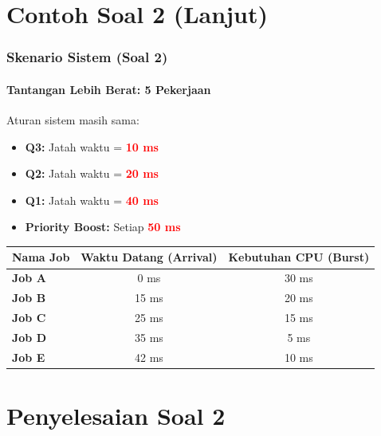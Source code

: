 \documentclass[t,aspectratio=169,xcolor=dvipsnames]{beamer}
\newcommand{\tem}[1]{\textbf{\textcolor{red}{#1}}}
\begin{document}
\section{Contoh Soal 2 (Lanjut)}

\begin{frame}
    \frametitle{Skenario Sistem (Soal 2)}
    \framesubtitle{Tantangan Lebih Berat: 5 Pekerjaan}
    \small
    Aturan sistem masih sama:
    \begin{itemize}
        \item \textbf{Q3:} Jatah waktu = \tem{10 ms}
        \item \textbf{Q2:} Jatah waktu = \tem{20 ms}
        \item \textbf{Q1:} Jatah waktu = \tem{40 ms}
        \item \textbf{Priority Boost:} Setiap \tem{50 ms}
    \end{itemize}
    \vspace{0.3cm}
    \begin{table}[]
        \centering
        \begin{tabular}{lcc}
            \toprule
            \textbf{Nama Job} & \textbf{Waktu Datang (Arrival)} & \textbf{Kebutuhan CPU (Burst)} \\
            \midrule
            \textbf{Job A} & 0 ms & 30 ms \\
            \textbf{Job B} & 15 ms & 20 ms \\
            \textbf{Job C} & 25 ms & 15 ms \\
            \textbf{Job D} & 35 ms & 5 ms \\
            \textbf{Job E} & 42 ms & 10 ms \\
            \bottomrule
        \end{tabular}
    \end{table}
\end{frame}

\section{Penyelesaian Soal 2}
\end{document}
